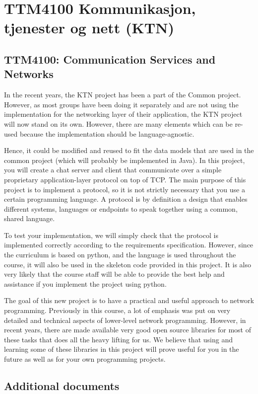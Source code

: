 \section{TTM4100 Kommunikasjon, tjenester og nett (KTN)}

\subsection{TTM4100: Communication Services and Networks}

In the recent years, the KTN project has been a part of the Common project. However, as most groups have been doing it separately and are not using the implementation for the networking layer of their application, the KTN project will now stand on its own. However, there are many elements which can be re-used because the implementation should be language-agnostic.

Hence, it could be modified and reused to fit the data models that are used in the common 
project (which will probably be implemented in Java). 
In this project, you will create a chat server and client that communicate over a simple 
proprietary application-layer protocol on top of TCP. The main purpose of this project is to implement a protocol, so it is not strictly necessary that you use a certain programming language. A protocol is by definition a design that enables different systems, languages or endpoints to speak together using a common, shared language. 

To test your implementation, we will simply check that the protocol is implemented correctly 
according to the requirements specification. However, since the curriculum is based on python, and the language is used throughout the course, it will also be used in the skeleton code provided in this project. It is also very likely that the course staff will be able to provide the best help and assistance if you implement the project using python.

The goal of this new project is to have a practical and useful approach to network programming. Previously in this course, a lot of emphasis was put on very detailed and technical aspects of lower-level network programming. However, in recent years, there are made available very good open source libraries for most of these tasks that does all the heavy lifting for us. We believe that using and learning some of these libraries in this project will prove useful for you in the future as well as for your own programming projects. 

\subsection{Additional documents}

